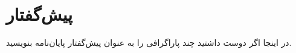 \newpage
\vspace*{-1cm}
\section*{پیش‌گفتار}
در اینجا اگر دوست داشتید چند پاراگرافی را به عنوان پیش‌گفتار پایان‌نامه بنویسید.